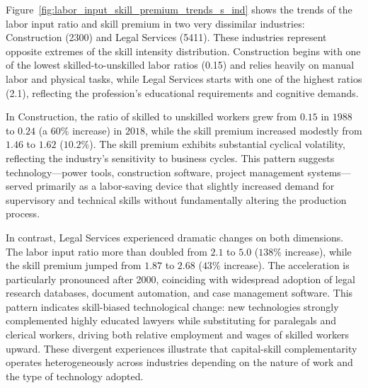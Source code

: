 \documentclass[12pt]{article}
\begin{document}


Figure~\ref{fig:labor_input_skill_premium_trends_s_ind} shows the trends of the labor input ratio and skill premium in two very dissimilar industries: Construction (2300) and Legal Services (5411). These industries represent opposite extremes of the skill intensity distribution. Construction begins with one of the lowest skilled-to-unskilled labor ratios (0.15) and relies heavily on manual labor and physical tasks, while Legal Services starts with one of the highest ratios (2.1), reflecting the profession's educational requirements and cognitive demands. 

In Construction, the ratio of skilled to unskilled workers grew from $0.15$ in $1988$ to $0.24$ (a $60\%$ increase) in $2018$, while the skill premium increased modestly from $1.46$ to $1.62$ ($10.2\%$). The skill premium exhibits substantial cyclical volatility, reflecting the industry's sensitivity to business cycles. This pattern suggests technology---power tools, construction software, project management systems---served primarily as a labor-saving device that slightly increased demand for supervisory and technical skills without fundamentally altering the production process.

In contrast, Legal Services experienced dramatic changes on both dimensions. The labor input ratio more than doubled from $2.1$ to $5.0$ ($138\%$ increase), while the skill premium jumped from $1.87$ to $2.68$ ($43\%$ increase). The acceleration is particularly pronounced after 2000, coinciding with widespread adoption of legal research databases, document automation, and case management software. This pattern indicates skill-biased technological change: new technologies strongly complemented highly educated lawyers while substituting for paralegals and clerical workers, driving both relative employment and wages of skilled workers upward. These divergent experiences illustrate that capital-skill complementarity operates heterogeneously across industries depending on the nature of work and the type of technology adopted.
\end{document}
